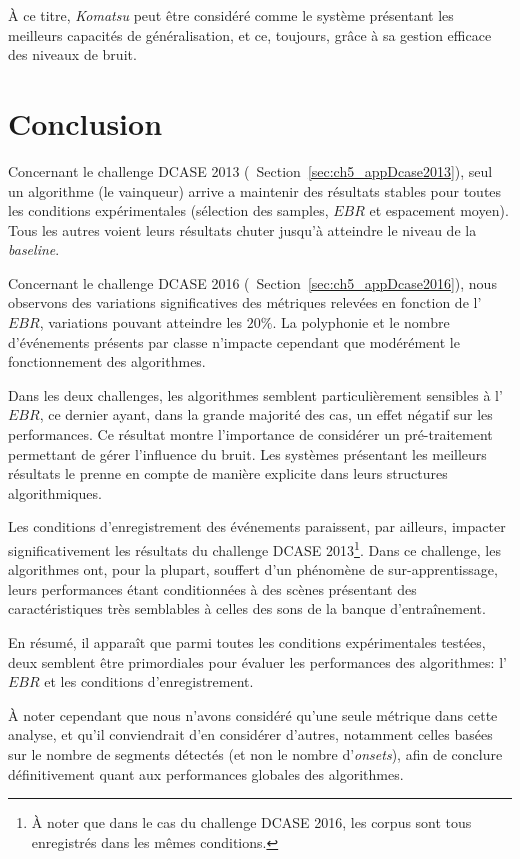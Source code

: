 À ce titre, \emph{Komatsu} peut être considéré comme le système présentant les meilleurs capacités de généralisation, et ce, toujours, grâce à sa gestion efficace des niveaux de bruit.

\section{Conclusion}

Concernant le challenge DCASE 2013 (\cf~Section~\ref{sec:ch5_appDcase2013}), seul un algorithme (le vainqueur) arrive a maintenir des résultats stables pour toutes les conditions expérimentales (sélection des samples, $EBR$ et espacement moyen). Tous les autres voient leurs résultats chuter jusqu'à atteindre le niveau de la \emph{baseline}.

Concernant le challenge DCASE 2016 (\cf~Section~\ref{sec:ch5_appDcase2016}), nous observons des variations significatives des métriques relevées en fonction de l'$EBR$, variations pouvant atteindre les $20\%$. La polyphonie et le nombre d'événements présents par classe n'impacte cependant que modérément le fonctionnement des algorithmes.

Dans les deux challenges, les algorithmes semblent particulièrement sensibles à l'$EBR$, ce dernier ayant, dans la grande majorité des cas, un effet négatif sur les performances. Ce résultat montre l'importance de considérer un pré-traitement permettant de gérer l'influence du bruit. Les systèmes présentant les meilleurs résultats le prenne en compte de manière explicite dans leurs structures algorithmiques.

Les conditions d'enregistrement des événements paraissent, par ailleurs, impacter significativement les résultats du challenge DCASE 2013\footnote{À noter que dans le cas du challenge DCASE 2016, les corpus sont tous enregistrés dans les mêmes conditions.}. Dans ce challenge, les algorithmes ont, pour la plupart, souffert d'un phénomène de sur-apprentissage, leurs performances étant conditionnées à des scènes présentant des caractéristiques très semblables à celles des sons de la banque d’entraînement.

En résumé, il apparaît que parmi toutes les conditions expérimentales testées, deux semblent être primordiales pour évaluer
les performances des algorithmes: l'$EBR$ et les conditions d'enregistrement.

À noter cependant que nous n'avons considéré qu'une seule métrique dans cette analyse, et qu'il conviendrait d'en considérer d'autres, notamment celles basées sur le nombre de segments détectés (et non le nombre d'\emph{onsets}), afin de conclure définitivement quant aux performances globales des algorithmes.

